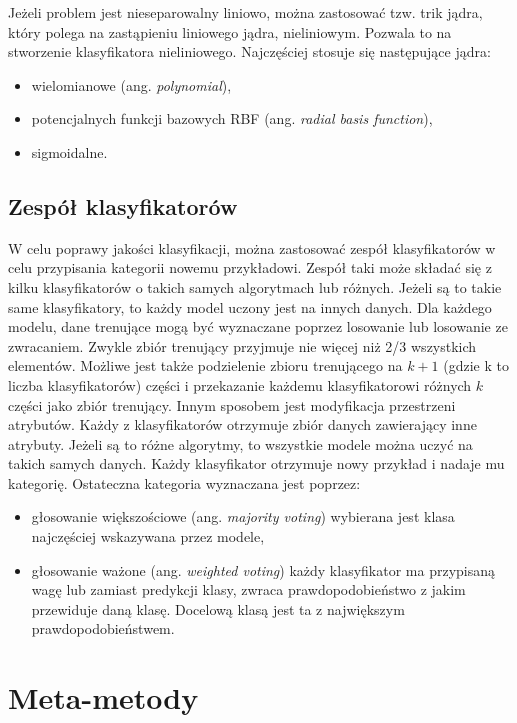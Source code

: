 Jeżeli problem jest nieseparowalny  liniowo, można zastosować tzw. trik jądra, który polega na zastąpieniu liniowego jądra, nieliniowym. Pozwala to na stworzenie klasyfikatora nieliniowego. Najczęściej stosuje się następujące jądra:
\begin{itemize}
	\item wielomianowe (ang. \textit{polynomial}),
	\item potencjalnych funkcji bazowych RBF (ang. \textit{radial basis function}),
	\item sigmoidalne.
\end{itemize}

  	
\subsection{Zespół klasyfikatorów}
W celu poprawy jakości klasyfikacji, można zastosować zespół klasyfikatorów w celu przypisania kategorii nowemu przykładowi. Zespół taki może składać się z kilku klasyfikatorów o takich samych algorytmach lub różnych. Jeżeli są to takie same klasyfikatory, to każdy model uczony jest na innych danych. Dla każdego modelu, dane trenujące mogą być wyznaczane poprzez losowanie lub losowanie ze zwracaniem. Zwykle zbiór trenujący przyjmuje nie więcej niż 2/3 wszystkich elementów. Możliwe jest także podzielenie zbioru trenującego na $k+1$ (gdzie k to liczba klasyfikatorów) części i przekazanie każdemu klasyfikatorowi różnych $k$ części jako zbiór trenujący. Innym sposobem jest modyfikacja przestrzeni atrybutów. Każdy z klasyfikatorów otrzymuje zbiór danych zawierający inne atrybuty. Jeżeli są to różne algorytmy, to wszystkie modele można uczyć na takich samych danych. Każdy klasyfikator otrzymuje nowy przykład i nadaje mu kategorię. Ostateczna kategoria wyznaczana jest poprzez:
\begin{itemize}
	\item głosowanie większościowe (ang. \textit{majority voting}) wybierana jest klasa najczęściej wskazywana przez modele,
	\item głosowanie ważone (ang. \textit{weighted voting}) każdy klasyfikator ma przypisaną wagę lub zamiast predykcji klasy, zwraca prawdopodobieństwo z jakim przewiduje daną klasę. Docelową klasą jest ta z największym prawdopodobieństwem.
\end{itemize} 
\section{Meta-metody}
